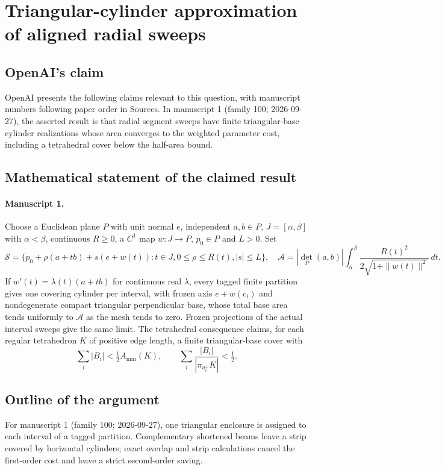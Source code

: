 \documentclass[11pt]{article}
\begin{document}
\section*{Triangular-cylinder approximation of aligned radial sweeps}

\subsection{OpenAI's claim}
OpenAI presents the following claims relevant to this question, with manuscript numbers following paper order in Sources. In manuscript 1 (family 100; 2026-09-27), the asserted result is that radial segment sweeps have finite triangular-base cylinder realizations whose area converges to the weighted parameter cost, including a tetrahedral cover below the half-area bound.

\subsection{Mathematical statement of the claimed result}
\paragraph{Manuscript 1.}
Choose a Euclidean plane $P$ with unit normal $e$, independent $a,b\in P$, $J=[\alpha,\beta]$ with $\alpha<\beta$, continuous $R\ge0$, a $C^1$ map $w:J\to P$, $p_0\in P$ and $L>0$. Set
\[
 \mathcal S=\{p_0+\rho(a+tb)+s(e+w(t)):t\in J,0\le\rho\le R(t),|s|\le L\},
 \quad\mathcal A=|\det_P(a,b)|\int_{\alpha}^{\beta}\frac{R(t)^2}{2\sqrt{1+\|w(t)\|^2}}\,dt.
\]
If $w'(t)=\lambda(t)(a+tb)$ for continuous real $\lambda$, every tagged finite partition gives one covering cylinder per interval, with frozen axis $e+w(c_i)$ and nondegenerate compact triangular perpendicular base, whose total base area tends uniformly to $\mathcal A$ as the mesh tends to zero. Frozen projections of the actual interval sweeps give the same limit. The tetrahedral consequence claims, for each regular tetrahedron $K$ of positive edge length, a finite triangular-base cover with
\[
 \sum_i|B_i|<\tfrac12 A_{\min}(K),\qquad
 \sum_i\frac{|B_i|}{|\pi_{u_i^{\perp}}K|}<\tfrac12.
\]

\subsection{Outline of the argument}
For manuscript 1 (family 100; 2026-09-27), one triangular enclosure is assigned to each interval of a tagged partition. Complementary shortened beams leave a strip covered by horizontal cylinders; exact overlap and strip calculations cancel the first-order cost and leave a strict second-order saving.
\end{document}
